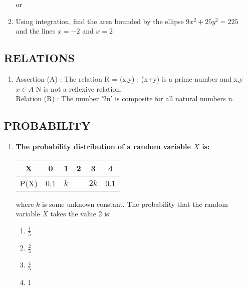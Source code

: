 \documentclass{article}
\begin{document}
\begin{enumerate}[label=\textbf{\arabic*.}]
\begin{enumerate}[label=\alph*)]
        or
        
        \item Using integration, find the area bounded by the ellipse \( 9x^2 + 25y^2 = 225 \) and the lines \( x = -2 \) and \( x = 2 \)
    \end{enumerate}
\subsection*{RELATIONS}
        \begin{enumerate}[label=\textbf{\arabic*.}] %
    \item {Assertion (A) : The relation R = {(x,y) : (x+y) is a prime number and x,y \(x \in A\) N is not a reflexive relation.\\
    Relation (R) : The number '2n' is composite for all natural numbers n.}}
    
    \end{enumerate}
    
\subsection*{PROBABILITY}
\begin{enumerate}[label=\textbf{\arabic*.}] %
    \item \textbf{The probability distribution of a random variable \(X\) is:}
    
    \begin{tabular}{|c|c|c|c|c|c|} %
    \hline %
    X & 0 & 1 & 2 & 3 & 4 \\ %
    \hline %
    P(X) & 0.1 & \(k\) &  & \(2k\) & 0.1 \\ %
    \hline %
    \end{tabular}
    
    where \(k\) is some unknown constant. The probability that the random variable \(X\) takes the value 2 is:
    
    \begin{enumerate}[label=\alph*)] %
        \item \(\frac{1}{5}\)
        \item \(\frac{2}{5}\)
        \item \(\frac{4}{5}\)
        \item 1
    \end{enumerate}


\end{enumerate}
\end{enumerate}
\end{document}
